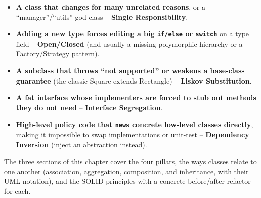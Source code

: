 \begin{patternbox}
\begin{itemize}
  \item \textbf{A class that changes for many unrelated reasons}, or a
        ``manager''/``utils'' god class -- \textbf{Single Responsibility}.
  \item \textbf{Adding a new type forces editing a big
        \texttt{if/else} or \texttt{switch}} on a type field --
        \textbf{Open/Closed} (and usually a missing polymorphic
        hierarchy or a Factory/Strategy pattern).
  \item \textbf{A subclass that throws ``not supported'' or weakens a
        base-class guarantee} (the classic Square-extends-Rectangle) --
        \textbf{Liskov Substitution}.
  \item \textbf{A fat interface whose implementers are forced to stub out
        methods they do not need} -- \textbf{Interface Segregation}.
  \item \textbf{High-level policy code that \texttt{new}s concrete
        low-level classes directly}, making it impossible to swap
        implementations or unit-test -- \textbf{Dependency Inversion}
        (inject an abstraction instead).
\end{itemize}
\end{patternbox}

The three sections of this chapter cover the four pillars, the ways
classes relate to one another (association, aggregation, composition, and
inheritance, with their UML notation), and the SOLID principles with a
concrete before/after refactor for each.

\newpage




